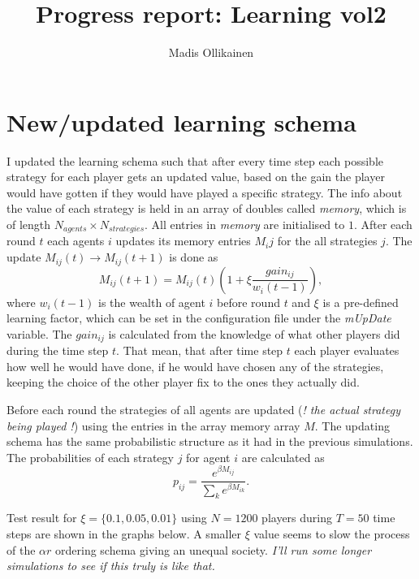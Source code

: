 \documentclass{article}
\author{Madis Ollikainen}
\title{Progress report: Learning vol2}
\begin{document}
\maketitle


\section{New/updated learning schema}
I updated the learning schema such that after every time step each possible strategy for each player gets an updated value, based on the gain the player would have gotten if they would have played a specific strategy. 
The info about the value of each strategy is held in an array of doubles called \emph{memory}, which is of length $N_{agents} \times N_{strategies}$. All entries in \emph{memory} are initialised to $1$. After each round $t$ each agents $i$ updates its memory entries $M_ij$ for the all strategies $j$. The update $M_{ij}(t) \rightarrow M_{ij}(t+1)$ is done as
\[
M_{ij}(t+1) = M_{ij}(t)\left(1 + \xi\frac{gain_{ij}}{w_i(t-1)} \right), 
\]   
where $w_i(t-1)$ is the wealth of agent $i$ before round $t$ and $\xi$ is a pre-defined learning factor, which can be set in the configuration file under the \emph{mUpDate} variable. The $gain_{ij}$ is calculated from the knowledge of what other players did during the time step $t$. That mean, that after time step $t$ each player evaluates how well he would have done, if he would have chosen any of the strategies, keeping the choice of the other player fix to the ones they actually did.   

\vspace{10pt}

Before each round the strategies of all agents are updated (\emph{! the actual strategy being played !}) using the entries in the array memory array $M$. The updating schema has the same probabilistic structure as it had in the previous simulations. The probabilities of each strategy $j$ for agent $i$ are calculated as
\[
p_{ij} = \frac{e^{\beta M_{ij}}}{\sum_{k}e^{\beta M_{ik}}}.
\]

\vspace{10pt}

Test result for $\xi = \{0.1, 0.05, 0.01 \}$ using $N=1200$ players during $T = 50$ time steps are shown in the graphs below. A smaller $\xi$ value seems to slow the process of the $\alpha r$ ordering schema giving an unequal society. \emph{I'll run some longer simulations to see if this truly is like that.}
\end{document}
